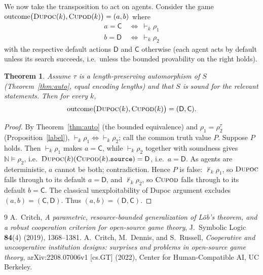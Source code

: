 \documentclass[11pt]{article}
\theoremstyle{definition}
\theoremstyle{plain}
\newtheorem{theorem}[definition]{Theorem}
\theoremstyle{remark}
\newcommand{\NN}{\mathbb{N}}
\newcommand{\source}{\mathtt{.source}}
\newcommand{\Cact}{\mathsf{C}}
\newcommand{\Dact}{\mathsf{D}}
\newcommand{\tr}{\tau}
\newcommand{\DUPOC}{\textsc{Dupoc}}
\newcommand{\CUPOD}{\textsc{Cupod}}
\begin{document}
We now take the transposition to act on agents. Consider the game $\mathrm{outcome}\big(\DUPOC(k),\CUPOD(k)\big)=(a,b)$ where
\begin{align*}
a=\Cact \ &\iff\ \vdash_k\rho_1\\
b=\Dact \ &\iff\ \vdash_k\rho_2
\end{align*}
with the respective default actions $\Dact$ and $\Cact$ otherwise (each agent acts by default unless its search succeeds, i.e.\ unless the bounded provability on the right holds).

\begin{theorem}\label{thm:op3}
Assume $\tr$ is a length-preserving automorphism of $S$ (Theorem~\ref{thm:auto}, equal encoding lengths) and that $S$ is sound for the relevant statements. Then for every $k$,
\[
\mathrm{outcome}\big(\DUPOC(k),\CUPOD(k)\big)=(\Dact,\Cact).
\]
\end{theorem}
\begin{proof}
By Theorem~\ref{thm:auto} (the bounded equivalence) and $\rho_1=\rho_2^{\tr}$ (Proposition~\ref{label}), $\vdash_k\rho_1\Leftrightarrow\vdash_k\rho_2$; call the common truth value $P$. Suppose $P$ holds. Then $\vdash_k\rho_1$ makes $a=\Cact$, while $\vdash_k\rho_2$ together with soundness gives $\NN\models\rho_2$, i.e.\ $\DUPOC(k)(\CUPOD(k)\source)=\Dact$, i.e.\ $a=\Dact$. As agents are deterministic, $a$ cannot be both; contradiction. Hence $P$ is false: $\nvdash_k\rho_1$, so $\DUPOC$ falls through to its default $a=\Dact$, and $\nvdash_k\rho_2$, so $\CUPOD$ falls through to its default $b=\Cact$. The classical unexploitability of Dupoc argument excludes $(a,b)=(\Cact, \Dact)$. Thus $(a,b)=(\Dact,\Cact)$.
\end{proof}




\begin{thebibliography}{9}
 A.~Critch, \emph{A parametric, resource-bounded generalization of L\"ob's theorem, and a robust cooperation criterion for open-source game theory}, J.~Symbolic Logic \textbf{84}(4) (2019), 1368--1381.
 A.~Critch, M.~Dennis, and S.~Russell, \emph{Cooperative and uncooperative institution designs: surprises and problems in open-source game theory}, arXiv:2208.07006v1 [cs.GT] (2022), Center for Human-Compatible AI, UC Berkeley.
\end{thebibliography}
\end{document}
